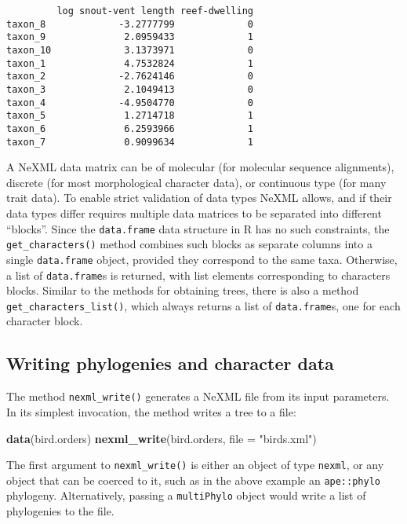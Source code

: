 \documentclass[author-year, review, 11pt]{elsarticle} %
\newenvironment{Shaded}{\begin{snugshade}}{\end{snugshade}}
\newcommand{\KeywordTok}[1]{\textcolor[rgb]{0.13,0.29,0.53}{\textbf{{#1}}}}
\newcommand{\DataTypeTok}[1]{\textcolor[rgb]{0.13,0.29,0.53}{{#1}}}
\newcommand{\StringTok}[1]{\textcolor[rgb]{0.31,0.60,0.02}{{#1}}}
\newcommand{\NormalTok}[1]{{#1}}
\begin{document}
\begin{verbatim}
         log snout-vent length reef-dwelling
taxon_8             -3.2777799             0
taxon_9              2.0959433             1
taxon_10             3.1373971             0
taxon_1              4.7532824             1
taxon_2             -2.7624146             0
taxon_3              2.1049413             0
taxon_4             -4.9504770             0
taxon_5              1.2714718             1
taxon_6              6.2593966             1
taxon_7              0.9099634             1
\end{verbatim}

A NeXML data matrix can be of molecular (for molecular sequence
alignments), discrete (for most morphological character data), or
continuous type (for many trait data). To enable strict validation of
data types NeXML allows, and if their data types differ requires
multiple data matrices to be separated into different ``blocks''. Since
the \texttt{data.frame} data structure in R has no such constraints, the
\texttt{get\_characters()} method combines such blocks as separate
columns into a single \texttt{data.frame} object, provided they
correspond to the same taxa. Otherwise, a list of \texttt{data.frame}s
is returned, with list elements corresponding to characters blocks.
Similar to the methods for obtaining trees, there is also a method
\texttt{get\_characters\_list()}, which always returns a list of
\texttt{data.frame}s, one for each character block.

\subsection{Writing phylogenies and character
data}\label{writing-phylogenies-and-character-data}

The method \texttt{nexml\_write()} generates a NeXML file from its input
parameters. In its simplest invocation, the method writes a tree to a
file:

\begin{Shaded}
\begin{Highlighting}[]
\KeywordTok{data}\NormalTok{(bird.orders)}
\KeywordTok{nexml_write}\NormalTok{(bird.orders, }\DataTypeTok{file =} \StringTok{"birds.xml"}\NormalTok{)}
\end{Highlighting}
\end{Shaded}

The first argument to \texttt{nexml\_write()} is either an object of
type \texttt{nexml}, or any object that can be coerced to it, such as in
the above example an \texttt{ape::phylo} phylogeny. Alternatively,
passing a \texttt{multiPhylo} object would write a list of phylogenies
to the file.
\end{document}
